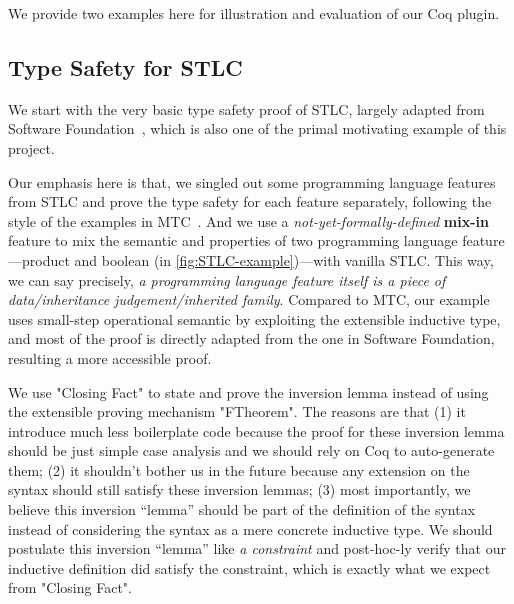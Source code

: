 We provide two examples here for illustration and evaluation of our Coq plugin. 

\subsection{Type Safety for STLC}
We start with the very basic type safety proof of STLC, largely adapted from Software Foundation~\cite{pierce2014software}, which is also one of the primal motivating example of this project. 

Our emphasis here is that, we singled out some programming language features from STLC and prove the type safety for each feature separately, following the style of the examples in MTC~\cite{delaware2013,forsta2020}. And we use a \textit{not-yet-formally-defined} \textbf{mix-in} feature to mix the semantic and properties of two programming language feature---product and boolean (in \cref{fig:STLC-example})---with vanilla STLC. This way, we can say precisely, \textit{a programming language feature itself is a piece of data/inheritance judgement/inherited family}. Compared to MTC, our example uses small-step operational semantic by exploiting the extensible inductive type, and most of the proof is directly adapted from the one in Software Foundation, resulting a more accessible proof. 

We use "Closing Fact" to state and prove the inversion lemma instead of using the extensible proving mechanism "FTheorem". The reasons are that (1) it introduce much less boilerplate code because the proof for these inversion lemma should be just simple case analysis and we should rely on Coq to auto-generate them; (2) it shouldn't bother us in the future because any extension on the syntax should still satisfy these inversion lemmas; (3) most importantly, we believe this inversion ``lemma'' should be part of the definition of the syntax instead of considering the syntax as a mere concrete inductive type. We should postulate this inversion ``lemma'' like \textit{a constraint} and post-hoc-ly verify that our inductive definition did satisfy the constraint, which is exactly what we expect from "Closing Fact".


